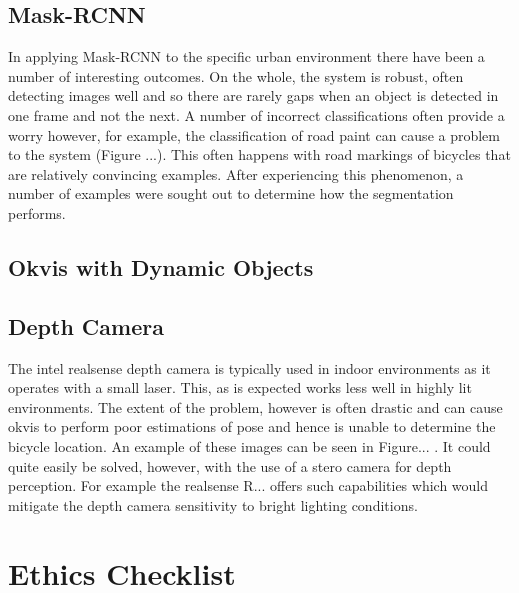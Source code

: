 \documentclass[a4paper,11pt,notitlepage]{article}
\begin{document}
\subsection{Mask-RCNN}
In applying Mask-RCNN to the specific urban environment there have been a number of interesting outcomes. On the whole, the system is robust, often detecting images well and so there are rarely gaps when an object is detected in one frame and not the next. A number of incorrect classifications often provide a worry however, for example, the classification of road paint can cause a problem to the system (Figure ...). This often happens with road markings of bicycles that are relatively convincing examples. After experiencing this phenomenon, a number of examples were sought out to determine how the segmentation performs.

\subsection{Okvis with Dynamic Objects}


\subsection{Depth Camera}

The intel realsense depth camera is typically used in indoor environments as it operates with a small laser. This, as is expected works less well in highly lit environments. The extent of the problem, however is often drastic and can cause okvis to perform poor estimations of pose and hence is unable to determine the bicycle location. An example of these images can be seen in Figure... . It could quite easily be solved, however, with the use of a stero camera for depth perception. For example the realsense R... offers such capabilities which would mitigate the depth camera sensitivity to bright lighting conditions.



\newpage
\section{Ethics Checklist}


\end{document}
